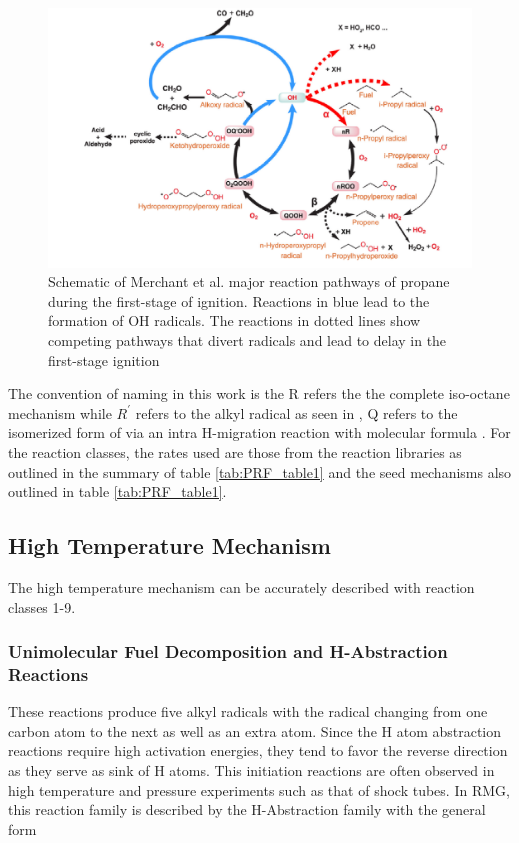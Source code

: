 \begin{figure}
\hspace*{-3cm}
    \centering
    \includegraphics[scale=0.4, keepaspectratio]{images/rxn_class.png}
    \caption{Schematic of Merchant et al.\cite{Merchant2015UnderstandingPropane} major reaction pathways of propane during the first-stage of ignition. Reactions in blue lead to the formation of OH radicals. The reactions in dotted lines show competing pathways that divert radicals and lead to delay in the first-stage ignition}
    \label{fig:n-alkane-pathway}
\end{figure}

The convention of naming in this work is the R refers the the complete iso-octane mechanism while $R^\prime$ refers to the alkyl radical as seen in , Q refers to the isomerized form of  via an intra H-migration reaction with molecular formula . For the reaction classes, the rates used are those from the reaction libraries as outlined in the summary of table \ref{tab:PRF_table1} and the seed mechanisms also outlined in table \ref{tab:PRF_table1}.

\cleardoublepage

\subsection{High Temperature Mechanism}

The high temperature mechanism can be accurately described with reaction classes 1-9.
\subsubsection{Unimolecular Fuel Decomposition and H-Abstraction Reactions} 
These reactions produce five alkyl radicals with the radical changing from one carbon atom to the next as well as an extra  atom. Since the H atom abstraction reactions require high activation energies, they tend to favor the reverse direction as they serve as sink of H atoms. This initiation reactions are often observed in high temperature and pressure experiments such as that of shock tubes. In RMG, this reaction family is described by the H-Abstraction family with the general form 

